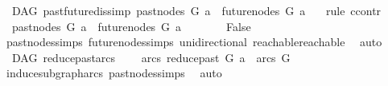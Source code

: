 \begin{isabellebody}
\endisatagproof
{\isafoldproof}%
%
\isadelimproof
\isanewline
%
\endisadelimproof
\isanewline
{}\isamarkupfalse%
\ {\isacharparenleft}{\kern0pt}\ DAG{\isacharparenright}{\kern0pt}\ past{\isacharunderscore}{\kern0pt}future{\isacharunderscore}{\kern0pt}dis{\isacharbrackleft}{\kern0pt}simp{\isacharbrackright}{\kern0pt}{\isacharcolon}{\kern0pt}\ {\isachardoublequoteopen}past{\isacharunderscore}{\kern0pt}nodes\ G\ a\ {\isasyminter}\ future{\isacharunderscore}{\kern0pt}nodes\ G\ a\ {\isacharequal}{\kern0pt}\ {\isacharbraceleft}{\kern0pt}{\isacharbraceright}{\kern0pt}{\isachardoublequoteclose}\isanewline
%
\isadelimproof
%
\endisadelimproof
%
\isatagproof
{}\isamarkupfalse%
\ {\isacharparenleft}{\kern0pt}rule\ ccontr{\isacharparenright}{\kern0pt}\isanewline
\ \ \isamarkupfalse%
\ {\isachardoublequoteopen}{\isasymnot}\ past{\isacharunderscore}{\kern0pt}nodes\ G\ a\ {\isasyminter}\ future{\isacharunderscore}{\kern0pt}nodes\ G\ a\ {\isacharequal}{\kern0pt}\ {\isacharbraceleft}{\kern0pt}{\isacharbraceright}{\kern0pt}{\isachardoublequoteclose}\isanewline
\ \ \isamarkupfalse%
\ \isamarkupfalse%
\ False\isanewline
\ \ \ \ \isamarkupfalse%
\ past{\isacharunderscore}{\kern0pt}nodes{\isachardot}{\kern0pt}simps\ future{\isacharunderscore}{\kern0pt}nodes{\isachardot}{\kern0pt}simps\ unidirectional\ reachable{}{\isacharunderscore}{\kern0pt}reachable\ \isamarkupfalse%
\ auto\isanewline
{}\isamarkupfalse%
%
\endisatagproof
{\isafoldproof}%
%
\isadelimproof
%
\endisadelimproof
%
\isadelimdocument
%
\endisadelimdocument
%
\isatagdocument
%
\isamarkuptrue%
%
\endisatagdocument
{\isafolddocument}%
%
\isadelimdocument
%
\endisadelimdocument
{}\isamarkupfalse%
\ {\isacharparenleft}{\kern0pt}\ DAG{\isacharparenright}{\kern0pt}\ reduce{\isacharunderscore}{\kern0pt}past{\isacharunderscore}{\kern0pt}arcs{\isacharcolon}{\kern0pt}\ \isanewline
\ \ \ {\isachardoublequoteopen}arcs\ {\isacharparenleft}{\kern0pt}reduce{\isacharunderscore}{\kern0pt}past\ G\ a{\isacharparenright}{\kern0pt}\ {\isasymsubseteq}\ arcs\ G{\isachardoublequoteclose}\isanewline
%
\isadelimproof
\ \ %
\endisadelimproof
%
\isatagproof
{}\isamarkupfalse%
\ induce{\isacharunderscore}{\kern0pt}subgraph{\isacharunderscore}{\kern0pt}arcs\ past{\isacharunderscore}{\kern0pt}nodes{\isachardot}{\kern0pt}simps\ \isamarkupfalse%
\ auto%
\endisatagproof
{\isafoldproof}%

\end{isabellebody}

